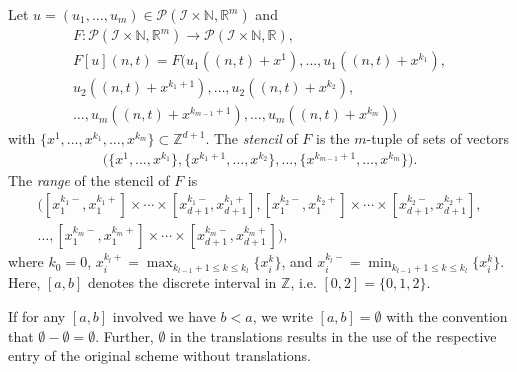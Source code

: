 \documentclass[runningheads]{llncs}
\newcommand{\Rr}{\mathbb{R}}
\newcommand{\Nn}{\mathbb{N}}
\newcommand{\Zz}{{\mathbb{Z}}}
\newcommand{\1}{\chi}
\newcommand{\Ii}{\mathcal{I}}
\begin{document}
\begin{definition}
	Let $u=(u_1,\ldots,u_m)\in\mathcal{P}(\Ii\times\Nn,\Rr^m)$ and
	\begin{gather*}
		F:
		\mathcal{P}(\Ii\times\Nn,\Rr^m)\rightarrow\mathcal{P}(\Ii\times\Nn,\Rr),\\
		F[u](n,t)=F(u_1((n,t)+x^1),\ldots,u_1((n,t)+x^{k_1}),\\
		u_2((n,t)+x^{k_1+1}),
		\ldots,u_2((n,t)+x^{k_2}),\\
		\ldots,
		u_m((n,t)+x^{k_{m-1}+1}),\ldots,u_m((n,t)+x^{k_m}))
	\end{gather*}
	\normalsize
	with $\{x^1,\ldots,x^{k_1},\ldots,x^{k_m}\}\subset\Zz^{d+1}$.
	The \emph{stencil} of $F$ is the $m$-tuple of sets of vectors
	\begin{gather*}
		\Big(\big\{x^1,\ldots,x^{k_1}\big\},
		\big\{x^{k_1+1},\ldots,x^{k_2}\big\},
		\ldots,
		\big\{x^{k_{m-1}+1},\ldots,x^{k_m}\big\}\Big).
	\end{gather*}
	The \emph{range} of the stencil of $F$ is
	\begin{gather*}
		\Big([x_1^{k_1 -},x_1^{k_1 +}]\times\cdots\times[x_{d+1}^{k_1 -},x_{d+1}^{k_1 +}],
		[x_1^{k_2 -},x_1^{k_2 +}]\times\cdots\times[x_{d+1}^{k_2 -},x_{d+1}^{k_2 +}],
		\\	\dots,
		[x_1^{k_m -},x_1^{k_m +}]\times\cdots\times[x_{d+1}^{k_m -},x_{d+1}^{k_m +}]
		\Big),
	\end{gather*}
	where $k_0=0$, $x^{k_l +}_i = \max_{k_{l-1}+1\leq k\leq k_l}\{x_i^k\}$,
	and $x^{k_l -}_i = \min_{k_{l-1}+1\leq k\leq k_l}\{x_i^k\}$. Here, $[a,b]$ denotes the discrete interval in $\Zz$, i.e. $[0,2]=\{0,1,2\}$.
\end{definition}
If for any $[a,b]$ involved we have $b<a$, we write $[a,b]=\emptyset$ with the convention that $\emptyset-\emptyset=\emptyset$.  Further, $\emptyset$ in the translations results in the use of the respective entry of the original scheme without translations.
\end{document}
